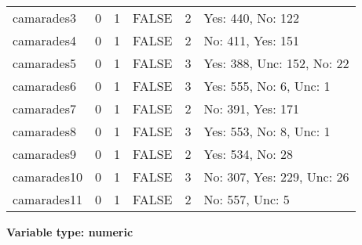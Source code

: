 \documentclass[
]{article}
\begin{document}
\begin{longtable}[]{@{}lrrlrl@{}}
camarades3 & 0 & 1 & FALSE & 2 & Yes: 440, No: 122 \\
camarades4 & 0 & 1 & FALSE & 2 & No: 411, Yes: 151 \\
camarades5 & 0 & 1 & FALSE & 3 & Yes: 388, Unc: 152, No: 22 \\
camarades6 & 0 & 1 & FALSE & 3 & Yes: 555, No: 6, Unc: 1 \\
camarades7 & 0 & 1 & FALSE & 2 & No: 391, Yes: 171 \\
camarades8 & 0 & 1 & FALSE & 3 & Yes: 553, No: 8, Unc: 1 \\
camarades9 & 0 & 1 & FALSE & 2 & Yes: 534, No: 28 \\
camarades10 & 0 & 1 & FALSE & 3 & No: 307, Yes: 229, Unc: 26 \\
camarades11 & 0 & 1 & FALSE & 2 & No: 557, Unc: 5 \\
\bottomrule
\end{longtable}

\textbf{Variable type: numeric}
\end{document}
